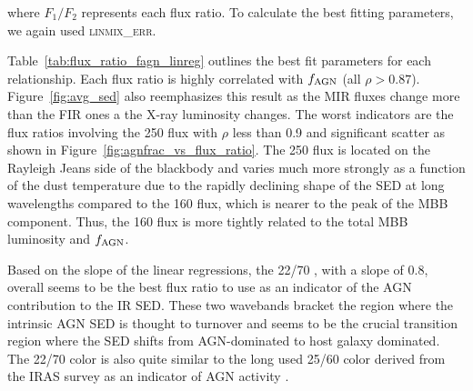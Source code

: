 \documentclass[fleqn, usenatbib]{mnras}
\begin{document}
\noindent where $F_{1}/F_{2}$ represents each flux ratio. To calculate the best fitting parameters, we again used \textsc{linmix\_err}. 

Table~\ref{tab:flux_ratio_fagn_linreg} outlines the best fit parameters for each relationship. Each flux ratio is highly correlated with $f_{\rm AGN}$ (all $\rho > 0.87$). {\color{red}Figure~\ref{fig:avg_sed} also reemphasizes this result as the MIR fluxes change more than the FIR ones a the X-ray luminosity changes.} The worst indicators are the flux ratios involving the 250 \micron{} flux with $\rho$ less than 0.9 and significant scatter as shown in Figure~\ref{fig:agnfrac_vs_flux_ratio}. The 250 \micron{} flux is located on the Rayleigh Jeans side of the blackbody and varies much more strongly as a function of the dust temperature due to the rapidly declining shape of the SED at long wavelengths compared to the 160 \micron{} flux, which is nearer to the peak of the MBB component. Thus, the 160 \micron{} flux is more tightly related to the total MBB luminosity and $f_{\rm AGN}$.

Based on the slope of the linear regressions, the 22/70 \micron{}, with a slope of 0.8, overall seems to be the best flux ratio to use as an indicator of the AGN contribution to the IR SED. These two wavebands bracket the region where the intrinsic AGN SED is thought to turnover \citep[e.g.][]{Netzer:2007ve, Mullaney:2011yq} and seems to be the crucial transition region where the SED shifts from AGN-dominated to host galaxy dominated. The 22/70 \micron{} color is also quite similar to the long used 25/60 \micron{} color derived from the IRAS survey as an indicator of AGN activity \citep{de-Grijp:1985lr,de-Grijp:1987gb}. 

\end{document}
